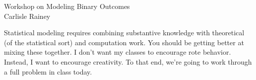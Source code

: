 \documentclass[12pt]{article}
\begin{document}
\begin{center}
{\LARGE Workshop on Modeling Binary Outcomes}\\\vspace{2mm}
Carlisle Rainey
\end{center}
\vspace{2mm}

Statistical modeling requires combining substantive knowledge with theoretical (of the statistical sort) and computation work. You should be getting better at mixing these together. I don't want my classes to encourage rote behavior. Instead, I want to encourage creativity. To that end, we're going to work through a full problem in class today.
\end{document}

